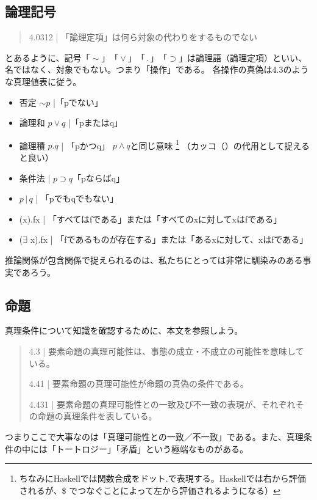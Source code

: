 \documentclass[a4paper,onecolumn,article]{jarticle}
\newcounter{ct}               %
\begin{document}
\subsection{論理記号}
\begin{quote}
  4.0312 | 「論理定項」は何ら対象の代わりをするものでない
\end{quote}
 とあるように、記号$「\sim」「\vee」 「\, . \,」 「\supset」$は論理語（論理定項）といい、名ではなく、対象でもない。つまり「操作」である。
各操作の真偽は4.3のような真理値表に従う。

\begin{itemize}
  \item 否定 $\sim p$ |「pでない」
  \item 論理和 $p\vee q$ |「pまたはq」
  \item 論理積 $p.q$ | 「pかつq」 $p \wedge q$と同じ意味 \footnote{ちなみにHaskellでは関数合成をドット$.$で表現する。Haskellでは右から評価されるが、\$ でつなぐことによって左から評価されるようになる）} （カッコ（）の代用として捉えると良い）
  \item 条件法  | $p \supset q$「pならばq」
  \item $p \, | \, q$ | 「pでもqでもない」
  \item (x).fx |  「すべてはfである」または「すべてのxに対してxはfである」
  \item ($\exists$ x).fx | 「fであるものが存在する」または「あるxに対して、xはfである」
\end{itemize}

推論関係が包含関係で捉えられるのは、私たちにとっては非常に馴染みのある事実であろう。


\subsection{命題}

真理条件について知識を確認するために、本文を参照しよう。

\begin{quote}
  4.3 | 要素命題の真理可能性は、事態の成立・不成立の可能性を意味している。

  4.41 | 要素命題の真理可能性が命題の真偽の条件である。

  4.431 | 要素命題の真理可能性との一致及び不一致の表現が、それぞれその命題の真理条件を表している。
\end{quote}

つまりここで大事なのは「真理可能性との一致／不一致」である。また、真理条件の中には「トートロジー」「矛盾」という極端なものがある。
\end{document}
